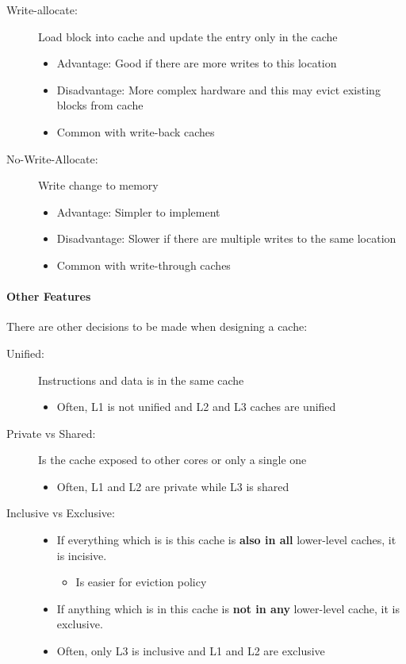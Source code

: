 \begin{description}
    \item[Write-allocate:] Load block into cache and update the entry only in the cache
        \begin{itemize}
            \item Advantage: Good if there are more writes to this location
            \item Disadvantage: More complex hardware and this may evict existing blocks from cache
            \item Common with write-back caches
        \end{itemize}
    \item[No-Write-Allocate:] Write change to memory
        \begin{itemize}
            \item Advantage: Simpler to implement
            \item Disadvantage: Slower if there are multiple writes to the same location
            \item Common with write-through caches
        \end{itemize}
\end{description}

\paragraph{Other Features}
There are other decisions to be made when designing a cache:

\begin{description}
    \item[Unified:] Instructions and data is in the same cache
        \begin{itemize}
            \item Often, L1 is not unified and L2 and L3 caches are unified
        \end{itemize}
    \item[Private vs Shared:] Is the cache exposed to other cores or only a single one
        \begin{itemize}
            \item Often, L1 and L2 are private while L3 is shared
        \end{itemize}
    \item[Inclusive vs Exclusive:] 
        \begin{itemize}
            \item If everything which is is this cache is \textbf{also in all} lower-level caches, it is incisive.
                \begin{itemize}
                    \item Is easier for eviction policy
                \end{itemize}
            \item If anything which is in this cache is \textbf{not in any} lower-level cache, it is exclusive.
            \item Often, only L3 is inclusive and L1 and L2 are exclusive
        \end{itemize}
\end{description}

